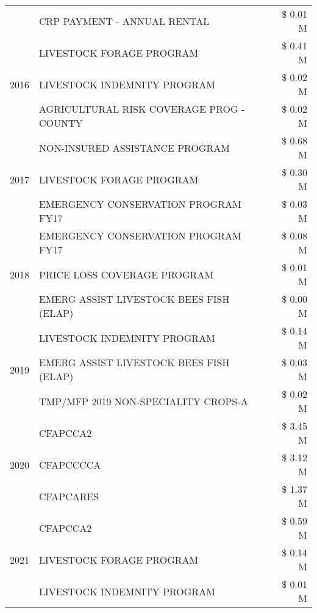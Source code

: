 \begin{tabular}{llr}
 & CRP PAYMENT - ANNUAL RENTAL & \$ 0.01 M \\
\cline{1-3}
\multirow[t]{3}{*}{2016} & LIVESTOCK FORAGE PROGRAM & \$ 0.41 M \\
 & LIVESTOCK INDEMNITY PROGRAM & \$ 0.02 M \\
 & AGRICULTURAL RISK COVERAGE PROG - COUNTY & \$ 0.02 M \\
\cline{1-3}
\multirow[t]{3}{*}{2017} & NON-INSURED ASSISTANCE PROGRAM & \$ 0.68 M \\
 & LIVESTOCK FORAGE PROGRAM & \$ 0.30 M \\
 & EMERGENCY CONSERVATION PROGRAM FY17 & \$ 0.03 M \\
\cline{1-3}
\multirow[t]{3}{*}{2018} & EMERGENCY CONSERVATION PROGRAM FY17 & \$ 0.08 M \\
 & PRICE LOSS COVERAGE PROGRAM & \$ 0.01 M \\
 & EMERG ASSIST LIVESTOCK BEES FISH (ELAP) & \$ 0.00 M \\
\cline{1-3}
\multirow[t]{3}{*}{2019} & LIVESTOCK INDEMNITY PROGRAM & \$ 0.14 M \\
 & EMERG ASSIST LIVESTOCK BEES FISH (ELAP) & \$ 0.03 M \\
 & TMP/MFP 2019 NON-SPECIALITY CROPS-A & \$ 0.02 M \\
\cline{1-3}
\multirow[t]{3}{*}{2020} & CFAPCCA2 & \$ 3.45 M \\
 & CFAPCCCCA & \$ 3.12 M \\
 & CFAPCARES & \$ 1.37 M \\
\cline{1-3}
\multirow[t]{3}{*}{2021} & CFAPCCA2 & \$ 0.59 M \\
 & LIVESTOCK FORAGE PROGRAM & \$ 0.14 M \\
 & LIVESTOCK INDEMNITY PROGRAM & \$ 0.01 M \\
\cline{1-3}
\bottomrule
\end{tabular}
